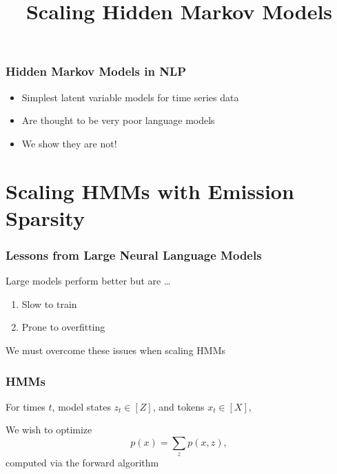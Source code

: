 \documentclass{beamer}
\title{Scaling Hidden Markov Models}
\begin{document}
\frame{\titlepage}

\begin{frame}
\frametitle{Hidden Markov Models in NLP}
\begin{itemize}
\item Simplest latent variable models for time series data
\vspace{2em}
\item Are thought to be very poor language models
\vspace{2em}
\item We show they are not!
\end{itemize}
\end{frame}

\section{Scaling HMMs with Emission Sparsity}

\begin{frame}
\frametitle{Lessons from Large Neural Language Models}

Large models perform better but are \ldots
\vspace{1em}
\begin{enumerate}
\item Slow to train
\vspace{1em}
\item Prone to overfitting
\end{enumerate}
\vspace{1em}
We must overcome these issues when scaling HMMs
\end{frame}

\begin{frame}
\frametitle{HMMs}

For times $t$, model states $z_t \in [Z]$, and tokens $x_t \in [X]$,

\begin{center}
\end{center}

\vspace{1em}
We wish to optimize
\begin{equation*}
p(x) = \sum_z p(x,z),
\end{equation*}
computed via the forward algorithm
\end{frame}
\end{document}
